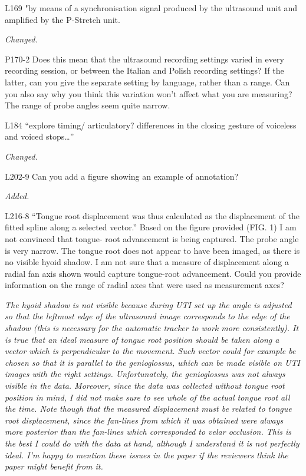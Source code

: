 \documentclass[]{article}
\begin{document}
L169 "by means of a synchronisation signal produced by the ultrasound
unit and amplified by the P-Stretch unit.

\begin{adjustwidth}{1cm}{} \textit{
Changed.
} \end{adjustwidth}

P170-2 Does this mean that the ultrasound recording settings varied in
every recording session, or between the Italian and Polish recording
settings? If the latter, can you give the separate setting by language,
rather than a range. Can you also say why you think this variation won't
affect what you are measuring? The range of probe angles seem quite
narrow.

L184 ``explore timing/ articulatory? differences in the closing gesture
of voiceless and voiced stops\ldots{}''

\begin{adjustwidth}{1cm}{} \textit{
Changed.
} \end{adjustwidth}

L202-9 Can you add a figure showing an example of annotation?

\begin{adjustwidth}{1cm}{} \textit{
Added.
} \end{adjustwidth}

L216-8 ``Tongue root displacement was thus calculated as the
displacement of the fitted spline along a selected vector.'' Based on
the figure provided (FIG. 1) I am not convinced that tongue- root
advancement is being captured. The probe angle is very narrow. The
tongue root does not appear to have been imaged, as there is no visible
hyoid shadow. I am not sure that a measure of displacement along a
radial fan axis shown would capture tongue-root advancement. Could you
provide information on the range of radial axes that were used as
measurement axes?

\begin{adjustwidth}{1cm}{} \textit{
The hyoid shadow is not visible because during UTI set up the angle is adjusted so that the leftmost edge of the ultrasound image corresponds to the edge of the shadow (this is necessary for the automatic tracker to work more consistently). It is true that an ideal measure of tongue root position should be taken along a vector which is perpendicular to the movement. Such vector could for example be chosen so that it is parallel to the genioglossus, which can be made visible on UTI images with the right settings. Unfortunately, the genioglossus was not always visible in the data. Moreover, since the data was collected without tongue root position in mind, I did not make sure to see whole of the actual tongue root all the time. Note though that the measured displacement must be related to tongue root displacement, since the fan-lines from which it was obtained were always more posterior than the fan-lines which corresponded to velar occlusion. This is the best I could do with the data at hand, although I understand it is not perfectly ideal. I'm happy to mention these issues in the paper if the reviewers think the paper might benefit from it.
} \end{adjustwidth}
\end{document}
